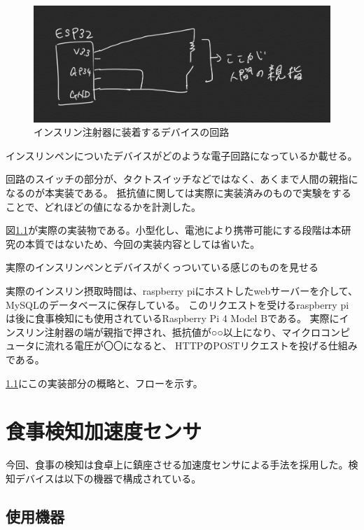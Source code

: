 \begin{figure}[htbp]
  \caption{インスリン注射器に装着するデバイスの回路}
  \label{fig:insulin_pen_device_circuit}
  \begin{center}
    \includegraphics[bb=0 0 1000 300,width=20cm]{assets/insulin_pen_device_circuit.png}
  \end{center}
\end{figure}


インスリンペンについたデバイスがどのような電子回路になっているか載せる。

回路のスイッチの部分が、タクトスイッチなどではなく、あくまで人間の親指になるのが本実装である。
抵抗値に関しては実際に実装済みのもので実験をすることで、どれほどの値になるかを計測した。

図\ref{}が実際の実装物である。小型化し、電池により携帯可能にする段階は本研究の本質ではないため、今回の実装内容としては省いた。

実際のインスリンペンとデバイスがくっついている感じのものを見せる

実際のインスリン摂取時間は、raspberry piにホストしたwebサーバーを介して、MySQLのデータベースに保存している。
このリクエストを受けるraspberry piは後に食事検知にも使用されているRaspberry Pi 4 Model Bである。
実際にインスリン注射器の端が親指で押され、抵抗値が○○以上になり、マイクロコンピュータに流れる電圧が〇〇になると、
HTTPのPOSTリクエストを投げる仕組みである。

\ref{}にこの実装部分の概略と、フローを示す。

\section{食事検知加速度センサ}

今回、食事の検知は食卓上に鎮座させる加速度センサによる手法を採用した。検知デバイスは以下の機器で構成されている。

\subsection{使用機器}

